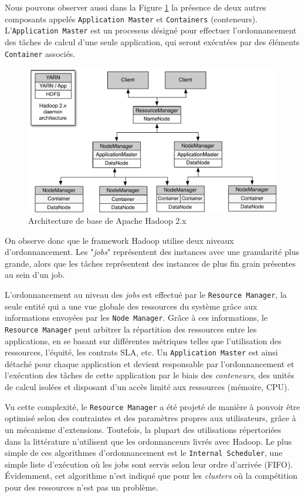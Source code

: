 Nous pouvons observer aussi dans la Figure \ref{fig:ArquiteturaHadoop} la présence de deux autres composants appelés \texttt{Application Master} et \texttt{Containers} (conteneurs). L'\texttt{Application Master} est un processus désigné pour effectuer l'ordonnancement des tâches de calcul d'une seule application, qui seront exécutées par des éléments \texttt{Container} associés.  

\begin{figure}[!ht]
	\centering
	\includegraphics[width=0.85\linewidth]{img/HadoopArch.pdf}
	\caption{Architecture de base de Apache Hadoop 2.x}
	\label{fig:ArquiteturaHadoop}
\end{figure}


On observe donc que le framework Hadoop utilise deux niveaux d'ordonnancement. Les "\textit{jobs}" représentent des instances avec une granularité plus grande, alors que les tâches représentent des instances de plus fin grain présentes au sein d'un job. 

L'ordonnancement au niveau des \textit{jobs} est effectué par le \texttt{Resource Manager}, la seule entité qui a une vue globale des ressources du système grâce aux informations envoyées par les \texttt{Node Manager}. Grâce à ces informations, le \texttt{Resource Manager} peut arbitrer la répartition des ressources entre les applications, en se basant sur différentes métriques telles que l'utilisation des ressources, l'équité, les contrats SLA, etc. Un \texttt{Application Master} est ainsi détaché pour chaque application et devient responsable par l'ordonnancement et l'exécution des tâches de cette application par le biais des \textit{conteneurs}, des unités de calcul isolées et disposant d'un accès limité aux ressources (mémoire, CPU). 

Vu cette complexité, le \texttt{Resource Manager} a été projeté de manière à pouvoir être optimisé selon des contraintes et des paramètres propres aux utilisateurs, grâce à un mécanisme d'extensions. Toutefois, la plupart des utilisations répertoriées dans la littérature n'utilisent que les ordonnanceurs livrés avec Hadoop. Le plus simple de ces algorithmes d'ordonnancement est le \texttt{Internal Scheduler}, une simple liste d'exécution où les jobs sont servis selon leur ordre d'arrivée (FIFO). Évidemment, cet algorithme n'est indiqué que pour les \textit{clusters} où la compétition pour des ressources n'est pas un problème. 

